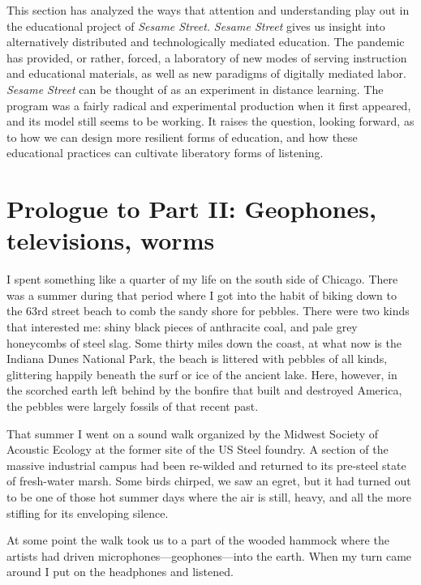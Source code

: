 \documentclass[12pt,letterpaper]{article}
\newcommand{\ses}{\textit{Sesame Street }}
\newcommand\myemptypage{
	\null
	\thispagestyle{empty}
	\addtocounter{page}{-1}
	\newpage
	}
\begin{document}
	This section has analyzed the ways that attention and understanding 
	play out in the educational project of \textit{Sesame Street.} 
	\ses gives us insight into alternatively distributed and 
	technologically mediated education. 
	The pandemic has provided, or rather, forced, a laboratory of new modes
	of serving instruction and educational materials, as well as new 
	paradigms of digitally mediated labor. \ses can be thought of as an 
	experiment in distance learning. The program was a fairly radical
	and experimental production when it first appeared, and its model 
	still seems to be working. It raises the question, looking forward,
	as to how we can design more resilient forms of education, and how
	these educational practices can cultivate liberatory forms of 
	listening. 

	\newpage	
	\myemptypage


	\newpage
	\section*{Prologue to Part II: Geophones, televisions, worms}

	I spent something like a quarter of my life on the south side of 
	Chicago. There was a summer during that period where I got into the 
	habit of biking down to the 63rd street beach to comb the sandy shore 
	for pebbles. There were two kinds that interested me: shiny black 
	pieces of anthracite coal, and pale grey honeycombs of steel slag. Some
	thirty miles down the coast, at what now is the Indiana Dunes National 
	Park, the beach is littered with pebbles of all kinds, glittering 
	happily beneath the surf or ice of the ancient lake. Here, however, in 
	the scorched earth left behind by the bonfire that built and destroyed 
	America, the pebbles were largely fossils of that recent past.

	That summer I went on a sound walk organized by the Midwest Society of
	Acoustic Ecology at the former site of the US Steel foundry. A section 
	of the massive industrial campus had been re-wilded and returned to its
	pre-steel state of fresh-water marsh. Some birds chirped, we saw an 
	egret, but it had turned out to be one of those hot summer days where 
	the air is still, heavy, and all the more stifling for its enveloping 
	silence. 

	At some point the walk took us to a part of the wooded hammock where 
	the artists had driven microphones---geophones---into the earth. When 
	my turn came around I put on the headphones and listened. 
\end{document}
